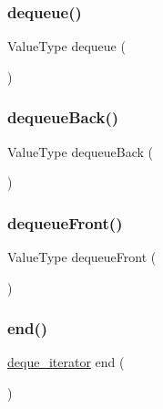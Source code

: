 \mbox{\label{classDeque_aaee07e371e2370e76e6c42bada727ba2}} 
\subsubsection{\texorpdfstring{dequeue()}{dequeue()}}
{\footnotesize\ttfamily Value\+Type dequeue (\begin{DoxyParamCaption}{ }\end{DoxyParamCaption})}

\mbox{\label{classDeque_a0f7233390ba171bc0897e5f9618ac4a6}} 
\subsubsection{\texorpdfstring{dequeue\+Back()}{dequeueBack()}}
{\footnotesize\ttfamily Value\+Type dequeue\+Back (\begin{DoxyParamCaption}{ }\end{DoxyParamCaption})}

\mbox{\label{classDeque_aecf002fe82a60407f6008f6fd7ac2c27}} 
\subsubsection{\texorpdfstring{dequeue\+Front()}{dequeueFront()}}
{\footnotesize\ttfamily Value\+Type dequeue\+Front (\begin{DoxyParamCaption}{ }\end{DoxyParamCaption})}

\mbox{\label{classDeque_a3f00605ada70bb4af841bafa03311f4a}} 
\subsubsection{\texorpdfstring{end()}{end()}\hspace{0.1cm}{\footnotesize\ttfamily [1/2]}}
{\footnotesize\ttfamily \mbox{\hyperlink{classDeque_1_1deque__iterator}{deque\+\_\+iterator}} end (\begin{DoxyParamCaption}{ }\end{DoxyParamCaption})\hspace{0.3cm}{\ttfamily [inline]}}


